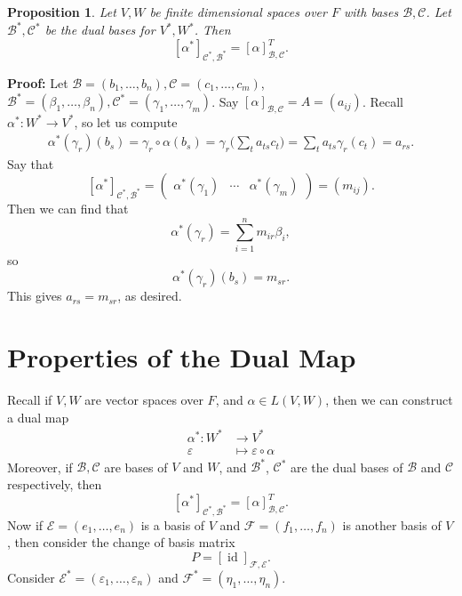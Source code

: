 \documentclass[12pt]{article}
\DeclareMathOperator{\id}{id}
\newtheorem{proposition}{Proposition}[section]
\theoremstyle{definition}
\theoremstyle{remark}
\begin{document}
\begin{proposition}
	Let $V, W$ be finite dimensional spaces over $F$ with bases $\mathcal{B}, \mathcal{C}$. Let $\mathcal{B}^{\ast}, \mathcal{C}^{\ast}$ be the dual bases for $V^{\ast}, W^{\ast}$. Then
	\[
		[\alpha^{\ast}]_{\mathcal{C}^{\ast}, \mathcal{B}^{\ast}} = [\alpha]_{\mathcal{B},\mathcal{C}}^{T}
	.\]
\end{proposition}

\begin{adjustbox}{minipage = \columnwidth - 25.5pt, margin=1em, frame=1pt, margin=0em}
	\textbf{Proof:} Let $\mathcal{B} = (b_1, \ldots, b_n), \mathcal{C} = (c_1, \ldots, c_m)$, $\mathcal{B}^{\ast} = (\beta_1, \ldots, \beta_n), \mathcal{C}^{\ast} = (\gamma_1, \ldots, \gamma_m)$. Say $[\alpha]_{\mathcal{B}, \mathcal{C}} = A = (a_{ij})$. Recall $\alpha^{\ast} : W^{\ast} \to V^{\ast}$, so let us compute
	\begin{align*}
		\alpha^{\ast}(\gamma_r)(b_s) = \gamma_r \circ \alpha(b_s) = \gamma_r \Biggl( \sum_{t} a_{ts} c_t \Biggr) = \sum_{t} a_{ts} \gamma_r(c_t) = a_{rs}.
	\end{align*}
	Say that
	\[
		[\alpha^{\ast}]_{\mathcal{C}^{\ast}, \mathcal{B}^{\ast}} = 
		\begin{pmatrix}
			\alpha^{\ast}(\gamma_1) & \cdots & \alpha^{\ast}(\gamma_m)
		\end{pmatrix}
		= (m_{ij})
	.\]
	Then we can find that
	\[
		\alpha^{\ast}(\gamma_r) = \sum_{i = 1}^{n} m_{ir}\beta_i
	,\]
	so
	\[
		\alpha^{\ast}(\gamma_r)(b_s) = m_{sr}
	.\]
	This gives $a_{rs} = m_{sr}$, as desired.
\end{adjustbox}

\newpage

\section{Properties of the Dual Map}%
\label{sec:properties_of_the_dual_map}

Recall if $V, W$ are vector spaces over $F$, and $\alpha \in L(V, W)$, then we can construct a dual map
\begin{align*}
	\alpha^{\ast} : W^{\ast} &\to V^{\ast} \\
	\varepsilon &\mapsto \varepsilon \circ \alpha
\end{align*}
Moreover, if $\mathcal{B}, \mathcal{C}$ are bases of $V$ and $W$, and $\mathcal{B}^{\ast}$, $\mathcal{C}^{\ast}$ are the dual bases of $\mathcal{B}$ and $\mathcal{C}$ respectively, then
\[
	[\alpha^{\ast}]_{\mathcal{C}^{\ast}, \mathcal{B}^{\ast}} = [\alpha]_{\mathcal{B}, \mathcal{C}}^{T}
.\]
Now if $\mathcal{E} = (e_1, \ldots, e_n)$ is a basis of $V$ and $\mathcal{F} = (f_1, \ldots, f_n)$ is another basis of $V$, then consider the change of basis matrix
\[
	P = [\id]_{\mathcal{F}, \mathcal{E}}
.\]
Consider $\mathcal{E}^{\ast} = (\varepsilon_1, \ldots, \varepsilon_n)$ and $\mathcal{F}^{\ast} = (\eta_1, \ldots, \eta_n)$.
\end{document}

